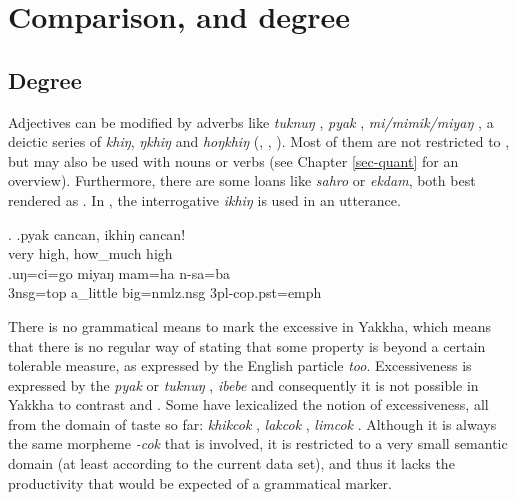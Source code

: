 \section{Comparison,  and degree}\label{sec-compar}
\subsection{Degree}

Adjectives can be modified by  adverbs like \emph{tuknuŋ} , \emph{pyak} , \emph{mi/mimik/miyaŋ} , a deictic series of \emph{khiŋ}, \emph{ŋkhiŋ} and \emph{hoŋkhiŋ} (, , ). Most of them are not restricted to , but may also be used with nouns or verbs (see Chapter \ref{sec-quant} for an overview). Furthermore, there are some  loans like \emph{sahro} or \emph{ekdam}, both best rendered as . In \Next[a], the interrogative \emph{ikhiŋ}  is used in an  utterance. 

\ex. \ag.pyak cancan, ikhiŋ   cancan!\\
		very high, how\_much high\\
	 
 	\bg.uŋ=ci=go  miyaŋ mam=ha n-sa=ba\\
	{\sc 3nsg=top} a\_little big{\sc =nmlz.nsg} {\sc 3pl-cop.pst=emph}		\\
	 

	
There is no grammatical means to mark the excessive in Yakkha, which means that there is no regular way of stating that some property is beyond a certain tolerable measure, as expressed by the English particle \emph{too}. Excessiveness is expressed by the  \emph{pyak}  or 
\emph{tuknuŋ} , \emph{ibebe}  and consequently it is not possible in Yakkha to contrast  and . Some  have lexicalized the notion of excessiveness, all from the  domain of taste so far: \emph{khikcok} , \emph{lakcok} , \emph{limcok} . Although it is  always the same morpheme \emph{-cok} that is involved, it is restricted to a very small semantic domain (at least according to the current data set), and thus it lacks the productivity that would be expected of a grammatical marker.


